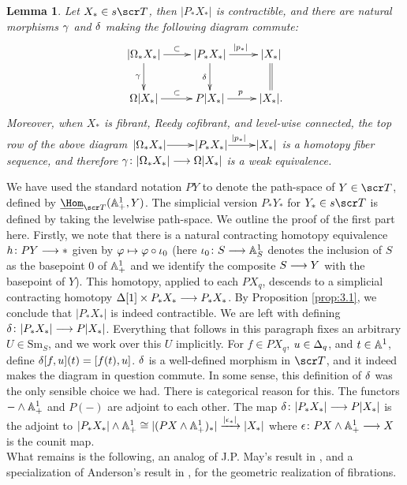 \documentclass{amsart}
\newtheorem{lem}[thm]{Lemma}
\theoremstyle{definition}
\begin{document}
\begin{lem}\label{lem:3.1.2}
Let $X_* \in s\sT$, then $|P_*X_*|$ is contractible, and there are natural morphisms $\gamma$ and $\delta$ making the following diagram commute:
\[
\xymatrix{
|\OM_* X_*| \ar[r]^{\subset} \ar[d]_{\ga} & |P_*X_*| \ar[d]_{\de} \ar[r]^{|p_*|} & |X_*| \ar@{=}[d]\\
\OM |X_*| \ar[r]^{\subset} & P|X_*| \ar[r]^p & |X_*|.
}
\]
\noindent Moreover, when $X_*$ is fibrant, Reedy cofibrant, and level-wise connected, the top row of the above diagram $\xymatrix@1{|\OM_* X_*| \ar[r] & |P_*X_*| \ar[r]^{|p_*|} & |X_*|}$ is a homotopy fiber sequence, and therefore $\gamma \colon |\Omega_* X_*| \longrightarrow \Omega|X_*|$ is a weak equivalence.
\end{lem}

\noindent We have used the standard notation $PY$ to denote the path-space of $Y \in \sT$, defined by $\underline{\Hom}_{\sT} (\bA^1_+, Y)$. The simplicial version $P_*Y_*$ for $Y_* \in s\sT$ is defined by taking the levelwise path-space. We outline the proof of the first part here. Firstly, we note that there is a natural contracting homotopy equivalence $h \colon PY \longrightarrow *$ given by $\varphi \mapsto \varphi \circ \iota_0$ (here $\iota_0 \colon S \longrightarrow \mathbb{A}^1_S$ denotes the inclusion of $S$ as the basepoint 0 of $\mathbb{A}^1_+$ and we identify the composite $S \longrightarrow Y$ with the basepoint of $Y$). This homotopy, applied to each $PX_q$, descends to a simplicial contracting homotopy $\Delta[1] \times P_*X_* \longrightarrow P_*X_*$. By Proposition \ref{prop:3.1}, we conclude that $|P_*X_*|$ is indeed contractible. We are left with defining $\delta \colon |P_*X_*| \longrightarrow P|X_*|$. Everything that follows in this paragraph fixes an arbitrary $U \in \mathrm{Sm}_S$, and we work over this $U$ implicitly. For $f \in PX_q$, $u \in \Delta_q$, and $t \in \mathbb{A}^1$, define $\delta[f,u](t)=[f(t),u]$. $\delta$ is a well-defined morphism in $\sT$, and it indeed makes the diagram in question commute. In some sense, this definition of $\delta$ was the only sensible choice we had. There is categorical reason for this. The functors $- \wedge \mathbb{A}^1_+$ and $P(-)$ are adjoint to each other. The map $\delta \colon |P_*X_*| \longrightarrow P|X_*|$ is the adjoint to $|P_*X_*| \wedge \mathbb{A}^1_+ \cong |(PX \wedge \mathbb{A}^1_+)_*| \xrightarrow{|\epsilon_*|} |X_*|$ where $\epsilon \colon PX \wedge \mathbb{A}^1_+ \longrightarrow X$ is the counit map.\\

What remains is the following, an analog of J.P. May's result in \cite{May72}, and a specialization of Anderson's result in \cite{anderson78fib}, for the geometric realization of fibrations.
\end{document}
